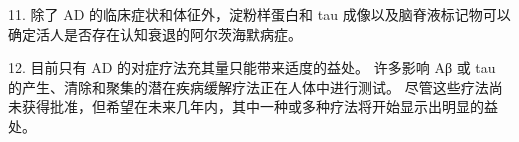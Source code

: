 11. 除了 AD 的临床症状和体征外，淀粉样蛋白和 tau 成像以及脑脊液标记物可以确定活人是否存在认知衰退的阿尔茨海默病症。 

12. 目前只有 AD 的对症疗法充其量只能带来适度的益处。 许多影响 Aβ 或 tau 的产生、清除和聚集的潜在疾病缓解疗法正在人体中进行测试。 尽管这些疗法尚未获得批准，但希望在未来几年内，其中一种或多种疗法将开始显示出明显的益处。


